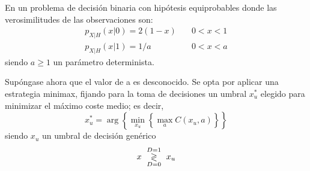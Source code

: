 \ifspanish

\question En un problema de decisión binaria con hipótesis equiprobables donde las verosimilitudes de las observaciones son:
 $$\begin{array}{ll}
 p_{X|H}(x|0)=2 \left(1-x \right) & \quad 0<x<1 \\
  p_{X|H}(x|1)=1/a & \quad 0<x<a
 \end{array}$$
siendo $a\geq1$ un parámetro determinista.
Supóngase ahora que el valor de a es desconocido. Se opta por aplicar una estrategia  minimax, fijando para la toma de decisiones un umbral  $x_u^*$ elegido para minimizar el máximo coste medio; es decir, 
 $$x_u^*=\arg \left\lbrace \min_{x_u}  \left\lbrace \max_a C(x_u,a)   \right\rbrace   \right\rbrace  $$
siendo  $x_u$ un umbral de decisión genérico
		 $$x \,\, \underset{D=0}{\overset{D=1}{\gtrless}}\,\, x_u$$
\begin{solution}
\end{solution}

